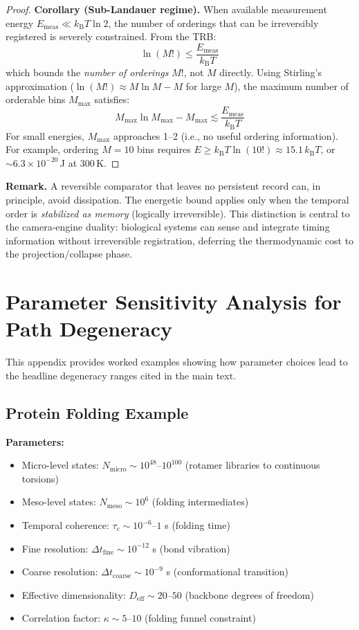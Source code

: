 \documentclass[12pt]{article}
\numberwithin{equation}{section}
\newcommand{\kB}{k_{\mathrm{B}}}
\begin{document}
\begin{proof}
\textbf{Corollary (Sub-Landauer regime).}
When available measurement energy $E_{\text{meas}} \ll \kB T\ln 2$, the number of orderings that can be irreversibly registered is severely constrained. From the TRB:
\begin{equation}
\ln(M!) \le \frac{E_{\text{meas}}}{\kB T}
\end{equation}
which bounds the \emph{number of orderings} $M!$, not $M$ directly. Using Stirling's approximation ($\ln(M!) \approx M\ln M - M$ for large $M$), the maximum number of orderable bins $M_{\max}$ satisfies:
\begin{equation}
M_{\max}\ln M_{\max} - M_{\max} \lesssim \frac{E_{\text{meas}}}{\kB T}
\end{equation}
For small energies, $M_{\max}$ approaches 1--2 (i.e., no useful ordering information). For example, ordering $M=10$ bins requires $E \ge \kB T \ln(10!) \approx 15.1\,\kB T$, or $\sim 6.3 \times 10^{-20}$\,J at 300\,K.
\end{proof}

\textbf{Remark.} A reversible comparator that leaves no persistent record can, in principle, avoid dissipation. The energetic bound applies only when the temporal order is \emph{stabilized as memory} (logically irreversible). This distinction is central to the camera-engine duality: biological systems can sense and integrate timing information without irreversible registration, deferring the thermodynamic cost to the projection/collapse phase.

\section{Parameter Sensitivity Analysis for Path Degeneracy}

This appendix provides worked examples showing how parameter choices lead to the headline degeneracy ranges cited in the main text.

\subsection{Protein Folding Example}

\textbf{Parameters:}
\begin{itemize}
\item Micro-level states: $N_{\text{micro}} \sim 10^{48}$--$10^{100}$ (rotamer libraries to continuous torsions)
\item Meso-level states: $N_{\text{meso}} \sim 10^{6}$ (folding intermediates)
\item Temporal coherence: $\tau_c \sim 10^{-6}$--$1$ s (folding time)
\item Fine resolution: $\Delta t_{\text{fine}} \sim 10^{-12}$ s (bond vibration)
\item Coarse resolution: $\Delta t_{\text{coarse}} \sim 10^{-9}$ s (conformational transition)
\item Effective dimensionality: $D_{\text{eff}} \sim 20$--$50$ (backbone degrees of freedom)
\item Correlation factor: $\kappa \sim 5$--$10$ (folding funnel constraint)
\end{itemize}
\end{document}
